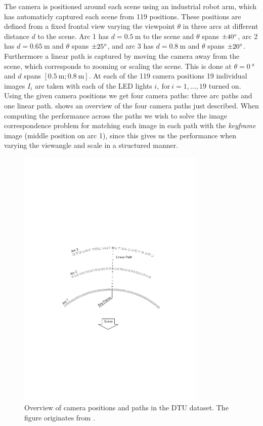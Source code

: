 \documentclass[thesis.tex]{subfiles}
\begin{document}
The camera is positioned around each scene using an industrial robot arm, which has automaticly captured each scene from 119 positions. These positions are defined from a fixed frontal view varying the viewpoint $\theta$ in three arcs at different distance $d$ to the scene. Arc 1 has $d = \SI{0.5}{\meter}$ to the scene and $\theta$ spans $\SI{\pm40}{\degree}$, arc 2 has $d = \SI{0.65}{\meter}$ and $\theta$ spans $\SI{\pm25}{\degree}$, and arc 3 has $d = \SI{0.8}{\meter}$ and $\theta$ spans $\SI{\pm20}{\degree}$. Furthermore a linear path is captured by moving the camera away from the scene, which corresponds to zooming or scaling the scene. This is done at $\theta = \SI{0}{\degree}$ and $d$ spans $[\SI{0.5}{\meter};\SI{0.8}{\meter} ]$. At each of the 119 camera positions 19 individual images $I_i$ are taken with each of the LED lights $i,~\text{for}~i = 1,\hdots,19$ turned on. Using the given camera positions we get four camera paths: three arc paths and one linear path.  shows an overview of the four camera paths just described. When computing the performance across the paths we wish to solve the image correspondence problem for matching each image in each path with the \emph{keyframe} image (middle position on arc 1), since this gives us the performance when varying the viewangle and scale in a structured manner.

\begin{figure}
	\centering
	\includegraphics[width=0.8\textwidth]{img/CameraPosb.pdf}
	\caption{Overview of camera positions and paths in the DTU dataset. The figure originates from \cite{aanaes2010recall}.}
	\label{fig:dtu_overview}
\end{figure}
\end{document}

